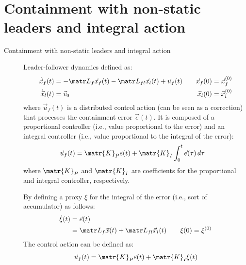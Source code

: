 \section{Containment with non-static leaders and integral action}

\begin{description}
    \item[Containment with non-static leaders and integral action] 
        Leader-follower dynamics defined as:
        \[
            \begin{aligned}
                \dot{\x}_f(t) &= -\lap_f \x_f(t) - \lap_{fl} \x_l(t) + \vec{u}_f(t) \quad & \x_f(0) &= \x_f^{(0)} \\
                \dot{\x}_l(t) &= \vec{v}_0 \quad & \x_l(0) &= \x_l^{(0)} \\
            \end{aligned}
        \]
        where $\vec{u}_f(t)$ is a distributed control action (can be seen as a correction) that processes the containment error $\vec{e}(t)$. It is composed of a proportional controller (i.e., value proportional to the error) and an integral controller (i.e., value proportional to the integral of the error):
        \[
            \begin{split}
                \vec{u}_f(t) &= \matr{K}_P \vec{e}(t) + \matr{K}_I \int_{0}^{t} \vec{e}(\tau) \,d\tau
            \end{split}
        \]
        where $\matr{K}_P$ and $\matr{K}_I$ are coefficients for the proportional and integral controller, respectively.
        
        By defining a proxy $\xi$ for the integral of the error (i.e., sort of accumulator) as follows:
        \[
            \begin{split}
                \dot{\xi}(t) &= \vec{e}(t) \\
                    &= \lap_f \vec{x}(t) + \lap_{fl} \x_l(t) \qquad \xi(0) = \xi^{(0)}
            \end{split}
        \]
        The control action can be defined as:
        \[
            \vec{u}_f(t) = \matr{K}_P \vec{e}(t) + \matr{K}_I \xi(t)
        \]


\end{description}
